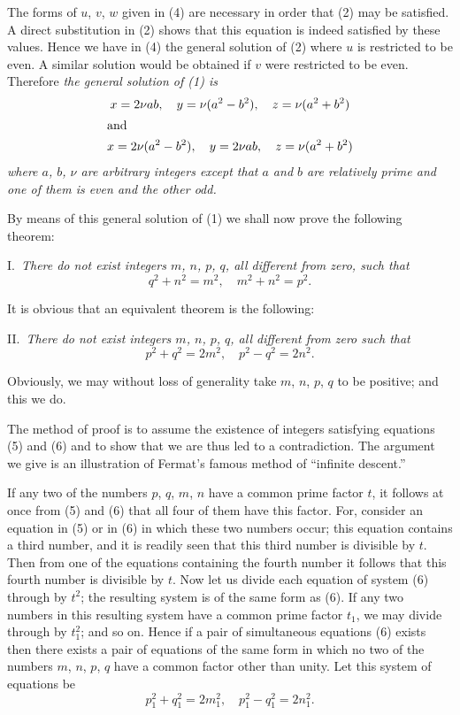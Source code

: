 \documentclass[oneside]{book}
\begin{document}
The forms of $u$, $v$, $w$ given in (4) are necessary in order that
(2) may be satisfied. A direct substitution in (2) shows that this
equation is indeed satisfied by these values. Hence we have in (4)
the general solution of (2) where $u$ is restricted to be even. A
similar solution would be obtained if $v$ were restricted to be
even. Therefore \emph{the general solution of (1) is
\begin{gather*}
x = 2\nu ab,\quad y = \nu (a^2 - b^2),\quad z = \nu (a^2 + b^2)\\
\intertext{and}
x = 2\nu (a^2 - b^2 ),\quad y = 2\nu ab,\quad z = \nu (a^2 + b^2)
\end{gather*}
where $a$, $b$, $\nu$ are arbitrary integers except that $a$ and $b$
are relatively prime and one of them is even and the other odd.}

By means of this general solution of (1) we shall now prove the
following theorem:

\smallskip I.~\emph{There do not exist integers $m$, $n$, $p$, $q$,
all different from zero, such that}
\begin{equation}
q^2 + n^2 = m^2 , \quad m^2 + n^2 = p^2. \tag{5}
\end{equation}

It is obvious that an equivalent theorem is the following:

\smallskip II.~\emph{There do not exist integers $m$, $n$, $p$, $q$,
all different from zero such that}
\begin{equation}
p^2 + q^2 = 2m^2, \quad p^2 - q^2 = 2n^2. \tag{6}
\end{equation}

Obviously, we may without loss of generality take $m$, $n$, $p$, $q$
to be positive; and this we do.

The method of proof is to assume the existence of integers
satisfying equations (5) and (6) and to show that we are thus led to
a contradiction. The argument we give is an illustration of Fermat's
famous method of ``infinite descent.''%

If any two of the numbers $p$, $q$, $m$, $n$ have a common prime
factor $t$, it follows at once from (5) and (6) that all four of
them have this factor. For, consider an equation in (5) or in (6) in
which these two numbers occur; this equation contains a third
number, and it is readily seen that this third number is divisible
by $t$. Then from one of the equations containing the fourth number
it follows that this fourth number is divisible by $t$. Now let us
divide each equation of system (6) through by $t^2$; the resulting
system is of the same form as (6). If any two numbers in this
resulting system have a common prime factor $t_1$, we may divide
through by $t_1^2$; and so on. Hence if a pair of simultaneous
equations (6) exists then there exists a pair of equations of the
same form in which no two of the numbers $m$, $n$, $p$, $q$ have a
common factor other than unity. Let this system of equations be
\begin{equation}
p_1^2 + q_1^2 = 2m_1^2, \quad p_1^2 - q_1^2 = 2n_1^2. \tag{7}
\end{equation}
\end{document}
